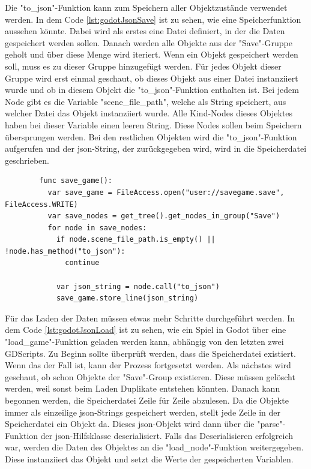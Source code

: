 Die "to\_json"-Funktion kann zum Speichern aller Objektzustände verwendet werden. In dem Code \ref{lst:godotJsonSave} ist zu sehen, wie eine Speicherfunktion aussehen könnte. Dabei wird als erstes eine Datei definiert, in der die Daten gespeichert werden sollen. Danach werden alle Objekte aus der "Save"-Gruppe geholt und über diese Menge wird iteriert. Wenn ein Objekt gespeichert werden soll, muss es zu dieser Gruppe hinzugefügt werden. Für jedes Objekt dieser Gruppe wird erst einmal geschaut, ob dieses Objekt aus einer Datei instanziiert wurde und ob in diesem Objekt die "to\_json"-Funktion enthalten ist. Bei jedem Node gibt es die Variable "scene\_file\_path", welche als String speichert, aus welcher Datei das Objekt instanziiert wurde. Alle Kind-Nodes dieses Objektes haben bei dieser Variable einen leeren String.\cite{godotengineNode} Diese Nodes sollen beim Speichern übersprungen werden. Bei den restlichen Objekten wird die "to\_json"-Funktion aufgerufen und der \ac{json}-String, der zurückgegeben wird, wird in die Speicherdatei geschrieben.\cite{godotengineSavingGames}

\begin{listing}[htp]
    \begin{verbatim}
        func save_game():
          var save_game = FileAccess.open("user://savegame.save", FileAccess.WRITE)
          var save_nodes = get_tree().get_nodes_in_group("Save")
          for node in save_nodes:
            if node.scene_file_path.is_empty() || !node.has_method("to_json"): 
              continue 

            var json_string = node.call("to_json")
            save_game.store_line(json_string)
    \end{verbatim}
    \caption{Beispiel für das Speichern mit \ac{json} in Godot\cite{godotengineSavingGames}}
    \label{lst:godotJsonSave}
\end{listing}

Für das Laden der Daten müssen etwas mehr Schritte durchgeführt werden. In dem Code \ref{lst:godotJsonLoad} ist zu sehen, wie ein Spiel in Godot über eine "load\_game"-Funktion geladen werden kann, abhängig von den letzten zwei GDScripts. Zu Beginn sollte überprüft werden, dass die Speicherdatei existiert. Wenn das der Fall ist, kann der Prozess fortgesetzt werden. Als nächstes wird geschaut, ob schon Objekte der "Save"-Group existieren. Diese müssen gelöscht werden, weil sonst beim Laden Duplikate entstehen könnten. Danach kann begonnen werden, die Speicherdatei Zeile für Zeile abzulesen. Da die Objekte immer als einzeilige \ac{json}-Strings gespeichert werden, stellt jede Zeile in der Speicherdatei ein Objekt da. Dieses \ac{json}-Objekt wird dann über die "parse"-Funktion der \ac{json}-Hilfsklasse deserialisiert. Falls das Deserialisieren erfolgreich war, werden die Daten des Objektes an die "load\_node"-Funktion weitergegeben. Diese instanziiert das Objekt und setzt die Werte der gespeicherten Variablen.\cite{godotengineSavingGames}

